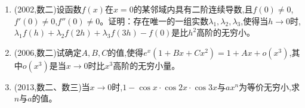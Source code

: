 \documentclass[12pt, a4paper, oneside, UTF8]{ctexbook}
\begin{document}
\begin{enumerate}[label=\arabic*.,start=12]
    \item  (2002,数二)设函数$f(x)$在$x=0$的某邻域内具有二阶连续导数,且$f(0)\neq0$,$f'(0)\neq0$,$f''(0)\neq0$。证明：存在唯一的一组实数$\lambda_1,\lambda_2,\lambda_3$,使得当$h\to0$时,$\lambda_1f(h)+\lambda_2f(2h)+\lambda_3f(3h)-f(0)$是比$h^2$高阶的无穷小。
    
    \begin{solution}
    \newpage
    \end{solution}
    
    \item  (2006,数二)试确定$A,B,C$的值,使得$e^x(1+Bx+Cx^2)=1+Ax+o(x^3)$,其中$o(x^3)$是当$x\to0$时比$x^3$高阶的无穷小量。
    
    \begin{solution}
    \newpage
    \end{solution}
    
    \item  (2013,数二、数三)当$x\to0$时,$1-\cos x\cdot\cos2x\cdot\cos3x$与$ax^n$为等价无穷小,求$n$与$a$的值。
    
    \begin{solution}
    \newpage
    \end{solution}
\end{enumerate}
\end{document}

